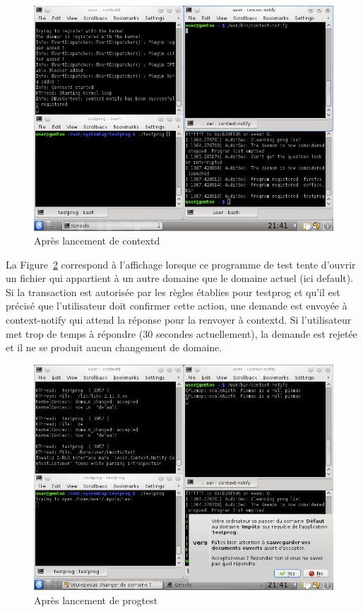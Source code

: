 \documentclass[pdftex,a4paper,titlepage,11pt]{article}
\begin{document}
\begin{figure}[h]
	\centering
	\includegraphics[scale=0.5]{attachements/capture_ini.png}
	\caption{Après lancement de contextd}
	\label{INI}
\end{figure}

La Figure~\ref{DEMANDE} correspond à l'affichage lorsque ce programme de test tente d'ouvrir un fichier qui appartient à un autre domaine que le domaine actuel (ici default). Si la transaction est autorisée par les règles établies pour testprog et qu'il est précisé que l'utilisateur doit confirmer cette action, une demande est envoyée à context-notify qui attend la réponse pour la renvoyer à contextd. Si l'utilisateur met trop de temps à répondre (30 secondes actuellement), la demande est rejetée et il ne se produit aucun changement de domaine.

\begin{figure}%
	\centering
	\includegraphics[scale=0.5]{attachements/capture_notify.png}
	\caption{Après lancement de progtest}
	\label{DEMANDE}
\end{figure}
\end{document}
